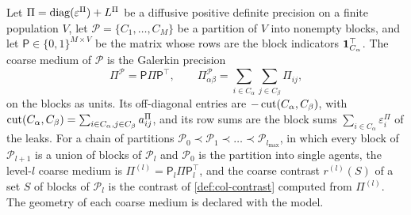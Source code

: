\begin{definition}\label{def:col-coarse-medium}
Let $\Pi=\operatorname{diag}(\varepsilon^\Pi)+L^\Pi$ be a diffusive positive definite precision on a finite population $V$, let $\mathcal P=\{C_1,\dots,C_M\}$ be a partition of $V$ into nonempty blocks, and let $\mathsf P\in\{0,1\}^{M\times V}$ be the matrix whose rows are the block indicators $\mathbf{1}_{C_\alpha}^\top$. The coarse medium of $\mathcal P$ is the Galerkin precision
\begin{equation}\label{eq:col-coarse-medium}
\Pi^{\mathcal P}=\mathsf P\Pi\mathsf P^\top,\qquad\Pi^{\mathcal P}_{\alpha\beta}=\sum_{i\in C_\alpha}\sum_{j\in C_\beta}\Pi_{ij},
\end{equation}
on the blocks as units. Its off-diagonal entries are $-\operatorname{cut}(C_\alpha,C_\beta)$, with $\operatorname{cut}(C_\alpha,C_\beta)=\sum_{i\in C_\alpha,j\in C_\beta}a^\Pi_{ij}$, and its row sums are the block sums $\sum_{i\in C_\alpha}\varepsilon^\Pi_i$ of the leaks. For a chain of partitions $\mathcal P_0\prec\mathcal P_1\prec\dots\prec\mathcal P_{l_{\max}}$, in which every block of $\mathcal P_{l+1}$ is a union of blocks of $\mathcal P_l$ and $\mathcal P_0$ is the partition into single agents, the level-$l$ coarse medium is $\Pi^{(l)}=\mathsf P_l\Pi\mathsf P_l^\top$, and the coarse contrast $r^{(l)}(S)$ of a set $S$ of blocks of $\mathcal P_l$ is the contrast of \cref{def:col-contrast} computed from $\Pi^{(l)}$. The geometry of each coarse medium is declared with the model.
\end{definition}

